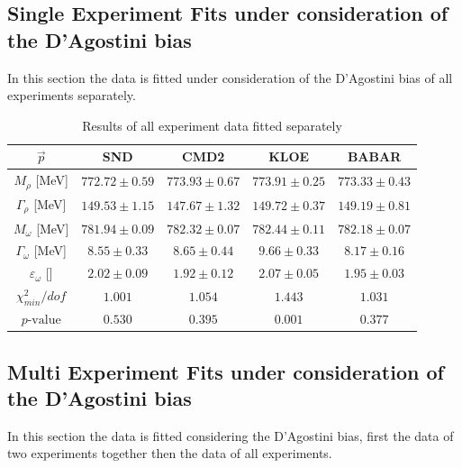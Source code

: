 \documentclass[a4paper]{article}
\begin{document}
\newpage
\subsection{Single Experiment Fits under consideration of the D'Agostini bias}
In this section the data is fitted under consideration of the D'Agostini bias of all experiments separately.
\begin{table}[h!]
    \caption{Results of all experiment data fitted separately\label{tabs}}
    \centering
    \begin{tabular}{|c|c|c|c|c|}
        \hline
        $\vec{p}$ & SND & CMD2 & KLOE & BABAR \\ \hline
        $M_{\rho}$    [MeV]          & $772.72	\pm 0.59$ & $773.93	\pm 0.67$ &$773.91	\pm 0.25 $&$773.33	\pm 0.43$ \\
        $\Gamma_{\rho}$   [MeV]      & $149.53	\pm 1.15$ & $147.67	\pm 1.32$ &$149.72	\pm 0.37 $&$149.19	\pm 0.81$\\
        $M_{\omega}$      [MeV]      & $781.94	\pm 0.09$ & $782.32	\pm 0.07$ &$782.44	\pm 0.11 $&$782.18	\pm 0.07$\\
        $\Gamma_{\omega}$    [MeV]   & $8.55	\pm 0.33    $ & $8.65	\pm 0.44$ &$9.66	\pm 0.33 $&$8.17	\pm 0.16$\\
        $\varepsilon_{\omega}$ [] & $2.02	\pm 0.09    $ & $1.92	\pm 0.12$ &$2.07	\pm 0.05 $&$1.95	\pm 0.03$\\
        \hline \hline
        $\chi^2_{min}/dof$      & $1.001$&$ 1.054$&$ 1.443$&$ 1.031$\\
        $p\text{-value}$        & $0.530$&$ 0.395$&$ 0.001$&$ 0.377$\\
        \hline
    \end{tabular}
\end{table}

\subsection{Multi Experiment Fits under consideration of the D'Agostini bias}
In this section the data is fitted considering the D'Agostini bias, first the data of
two experiments together then the data of all experiments.
\end{document}
